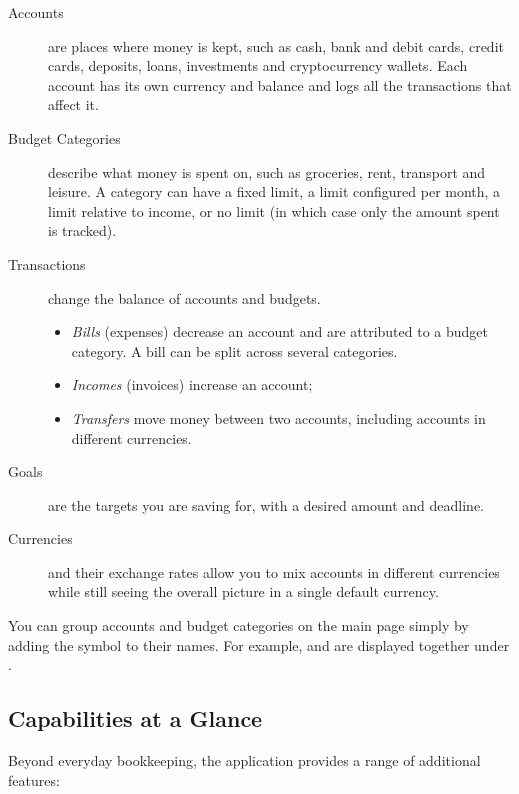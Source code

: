 \begin{description}
  \item[Accounts] are places where money is kept, such as cash, bank and debit cards, credit
  cards, deposits, loans, investments and cryptocurrency wallets. Each account has its own
  currency and balance and logs all the transactions that affect it.
  \item[Budget Categories] describe what money is spent on, such as groceries, rent,
  transport and leisure. A category can have a fixed limit, a limit configured per month, a
  limit relative to income, or no limit (in which case only the amount spent is tracked).
  \item[Transactions] change the balance of accounts and budgets.
    \begin{itemize}
      \item \emph{Bills} (expenses) decrease an account and are attributed to a budget
      category. A bill can be split across several categories.
      \item \emph{Incomes} (invoices) increase an account;
      \item \emph{Transfers} move money between two accounts, including accounts in different
      currencies.
    \end{itemize}
  \item[Goals] are the targets you are saving for, with a desired amount and deadline.
  \item[Currencies] and their exchange rates allow you to mix accounts in different
  currencies while still seeing the overall picture in a single default currency.
\end{description}

\noindent You can group accounts and budget categories on the main page simply by adding the
\q{/} symbol to their names. For example,  and  are displayed
together under .


\subsection*{Capabilities at a Glance}

Beyond everyday bookkeeping, the application provides a range of additional features:

